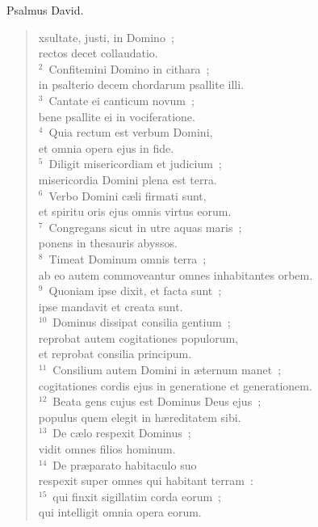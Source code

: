 \bchapter[Psalm]
Psalmus David. \begin{verse}xsultate, justi, in Domino~;\\ rectos decet collaudatio.\\
${}^{2}$~Confitemini Domino in cithara~;\\ in psalterio decem chordarum psallite illi.\\
${}^{3}$~Cantate ei canticum novum~;\\ bene psallite ei in vociferatione.\\
${}^{4}$~Quia rectum est verbum Domini,\\ et omnia opera ejus in fide.\\
${}^{5}$~Diligit misericordiam et judicium~;\\ misericordia Domini plena est terra.\\
${}^{6}$~Verbo Domini c\ae li firmati sunt,\\ et spiritu oris ejus omnis virtus eorum.\\
${}^{7}$~Congregans sicut in utre aquas maris~;\\ ponens in thesauris abyssos.\\
${}^{8}$~Timeat Dominum omnis terra~;\\ ab eo autem commoveantur omnes inhabitantes orbem.\\
${}^{9}$~Quoniam ipse dixit, et facta sunt~;\\ ipse mandavit et creata sunt.\\
${}^{10}$~Dominus dissipat consilia gentium~;\\ reprobat autem cogitationes populorum,\\ et reprobat consilia principum.\\
${}^{11}$~Consilium autem Domini in \ae ternum manet~;\\ cogitationes cordis ejus in generatione et generationem.\\
${}^{12}$~Beata gens cujus est Dominus Deus ejus~;\\ populus quem elegit in h\ae reditatem sibi.\\
${}^{13}$~De c\ae lo respexit Dominus~;\\ vidit omnes filios hominum.\\
${}^{14}$~De pr\ae parato habitaculo suo\\ respexit super omnes qui habitant terram~:\\
${}^{15}$~qui finxit sigillatim corda eorum~;\\ qui intelligit omnia opera eorum.\\

\end{verse}

